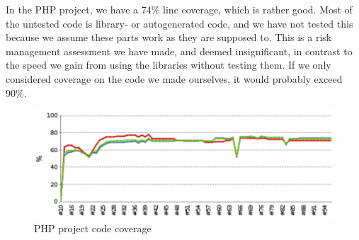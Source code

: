 \noindent
In the PHP project, we have a 74\% line coverage, which is rather good. Most of the untested code is library- or autogenerated code, and we have not tested this because we assume these parts work as they are supposed to. This is a risk management assessment we have made, and deemed insignificant, in contrast to the speed we gain from using the libraries without testing them. If we only considered coverage on the code we made ourselves, it would probably exceed 90\%. 

\begin{figure}[!htbp]
    \centering
    \includegraphics[width=\textwidth]{graphic/quality_assurance/jenkins_php_code_coverage}
    \caption{PHP project code coverage}
    \label{fig:php_project_code_coverage}
\end{figure}
\FloatBarrier

